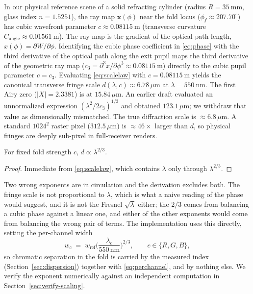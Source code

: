 In our physical reference scene of a solid refracting cylinder (radius $R = \SI{35}{\milli\meter}$, glass index $n = 1.5251$), the ray map $\mathbf{x}(\phi)$ near the fold locus ($\phi_f \approx 207.70^\circ$) has cubic wavefront parameter $c \approx \SI{0.08115}{\meter}$ (transverse curvature $C_{\text{angle}} \approx \SI{0.01561}{\meter}$). The ray map is the gradient of the optical path length, $x(\phi) = \partial W / \partial \phi$. Identifying the cubic phase coefficient in \eqref{eq:phase} with the third derivative of the optical path along the exit pupil maps the third derivative of the geometric ray map ($c_3 = \partial^3 x / \partial \phi^3 \approx \SI{0.08115}{\meter}$) directly to the cubic pupil parameter $c = c_3$. Evaluating \eqref{eq:scalelaw} with $c = \SI{0.08115}{\meter}$ yields the canonical transverse fringe scale $d(\lambda,c) \approx 6.78\,\mu\text{m}$ at $\lambda = \SI{550}{\nano\meter}$. The first Airy zero ($|X| = 2.3381$) is at $15.84\,\mu\text{m}$. An earlier draft evaluated an unnormalized expression $(\lambda^2 / 2 c_3)^{1/3}$ and obtained $123.1\,\mu\text{m}$; we withdraw that value as dimensionally mismatched. The true diffraction scale is $\approx 6.8\,\mu\text{m}$. A standard $1024^2$ raster pixel ($312.5\,\mu\text{m}$) is $\approx 46\times$ larger than $d$, so physical fringes are deeply sub-pixel in full-receiver renders.

\begin{corollary}
\label{cor:scaling}
For fixed fold strength $c$, $d \propto \lambda^{2/3}$.
\end{corollary}

\begin{proof}
Immediate from \eqref{eq:scalelaw}, which contains $\lambda$ only through
$\lambda^{2/3}$.
\end{proof}

Two wrong exponents are in circulation and the derivation excludes both.
The fringe scale is not proportional to $\lambda$, which is what a naive
reading of the phase would suggest, and it is not the Fresnel
$\sqrt{\lambda}$ either; the $2/3$ comes from balancing a cubic phase against a
linear one, and either of the other exponents would come from balancing the
wrong pair of terms. The implementation uses this directly, setting the
per-channel width
\begin{equation}
w_c \;=\; w_{\text{ref}}\Big(\frac{\lambda_c}{550\,\si{\nano\meter}}\Big)^{2/3},
\qquad c \in \{R,G,B\},
\label{eq:perchannel}
\end{equation}
so chromatic separation in the fold is carried by the measured index
(Section~\ref{sec:dispersion}) together with \eqref{eq:perchannel}, and by
nothing else. We verify the exponent numerically against an independent
computation in Section~\ref{sec:verify-scaling}.

